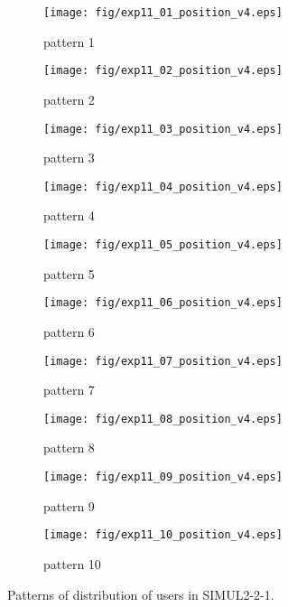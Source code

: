 \begin{figure}
	\begin{center}
		\begin{subfigure}[b]{0.32\textwidth}
			\texttt{[image: fig/exp11\_01\_position\_v4.eps]}
			\caption{pattern 1}
			\label{figure:simul2_2_1_a}
		\end{subfigure}
		\begin{subfigure}[b]{0.32\textwidth}
			\texttt{[image: fig/exp11\_02\_position\_v4.eps]}
			\caption{pattern 2}
			\label{figure:simul2_2_1_b}
		\end{subfigure}
		\begin{subfigure}[b]{0.32\textwidth}
			\texttt{[image: fig/exp11\_03\_position\_v4.eps]}
			\caption{pattern 3}
			\label{figure:simul2_2_1_c}
		\end{subfigure}
		\begin{subfigure}[b]{0.32\textwidth}
			\texttt{[image: fig/exp11\_04\_position\_v4.eps]}
			\caption{pattern 4}
			\label{figure:simul2_2_1_d}
		\end{subfigure}
		\begin{subfigure}[b]{0.32\textwidth}
			\texttt{[image: fig/exp11\_05\_position\_v4.eps]}
			\caption{pattern 5}
			\label{figure:simul2_2_1_e}
		\end{subfigure}
		\begin{subfigure}[b]{0.32\textwidth}
			\texttt{[image: fig/exp11\_06\_position\_v4.eps]}
			\caption{pattern 6}
			\label{figure:simul2_2_1_f}
		\end{subfigure}
		\begin{subfigure}[b]{0.32\textwidth}
			\texttt{[image: fig/exp11\_07\_position\_v4.eps]}
			\caption{pattern 7}
			\label{figure:simul2_2_1_g}
		\end{subfigure}
		\begin{subfigure}[b]{0.32\textwidth}
			\texttt{[image: fig/exp11\_08\_position\_v4.eps]}
			\caption{pattern 8}
			\label{figure:simul2_2_1_h}
		\end{subfigure}
		\begin{subfigure}[b]{0.32\textwidth}
			\texttt{[image: fig/exp11\_09\_position\_v4.eps]}
			\caption{pattern 9}
			\label{figure:simul2_2_1_i}
		\end{subfigure}
		\begin{subfigure}[b]{0.32\textwidth}
			\texttt{[image: fig/exp11\_10\_position\_v4.eps]}
			\caption{pattern 10}
			\label{figure:simul2_2_1_j}
		\end{subfigure}
		\caption{Patterns of distribution of users in SIMUL2-2-1.}
		\label{figure:simul2_2_1_p}
	\end{center}
\end{figure}

